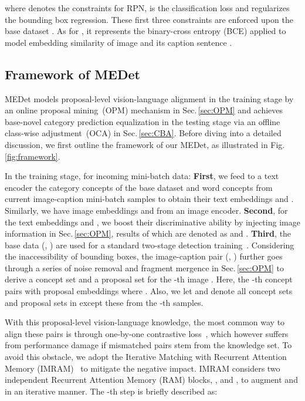 \documentclass[10pt,twocolumn,letterpaper]{article}
\begin{document}
where  denotes the constraints for RPN,  is the classification loss and  regularizes the bounding box regression. These first three constraints are enforced upon the base dataset . As for , it represents the binary-cross entropy (BCE) applied to model embedding similarity of image  and its caption sentence .










\subsection{Framework of MEDet}
\label{sec:LearningMEDet}

MEDet models proposal-level vision-language alignment in the training stage by an online proposal mining~(OPM) mechanism in Sec.\,\ref{sec:OPM} and achieves base-novel category prediction equalization in the testing stage via an offline class-wise adjustment~(OCA) in Sec.\,\ref{sec:CBA}.
Before diving into a detailed discussion, we first outline the framework of our MEDet, as illustrated in Fig.\,\ref{fig:framework}.


In the training stage, for incoming mini-batch data: 
\textbf{First}, we feed to a text encoder the category concepts of the base dataset and word concepts from current image-caption mini-batch samples to obtain their text embeddings  and .
Similarly, we have image embeddings  and  from an image encoder. 
\textbf{Second}, for the text embeddings  and , we boost their discriminative ability by injecting image information in Sec.\,\ref{sec:OPM}, results of which are denoted as  and . 
\textbf{Third}, the base data (, ) are used for a standard two-stage detection training~\cite{fasterrcnn}.
Considering the inaccessibility of bounding boxes, the image-caption pair (, ) further goes through a series of noise removal and fragment mergence in Sec.\,\ref{sec:OPM} 
to derive a concept set  and a proposal set  for the -th image . Here, the -th concept  pairs with  proposal embeddings  where .
Also, we let  and  denote all concept sets and proposal sets in  except these from the -th samples.


With this proposal-level vision-language knowledge, the most common way to align these pairs is through one-by-one contrastive loss~\cite{regionCLIP}, which however suffers from performance damage if mismatched pairs stem from the knowledge set. To avoid this obstacle, we adopt the Iterative Matching with Recurrent Attention Memory (IMRAM)~\cite{imram} to mitigate the negative impact. 
IMRAM considers two independent Recurrent Attention Memory (RAM) blocks, \ie,  and , to augment  and  in an iterative manner. The -th step is briefly described as:
\end{document}
